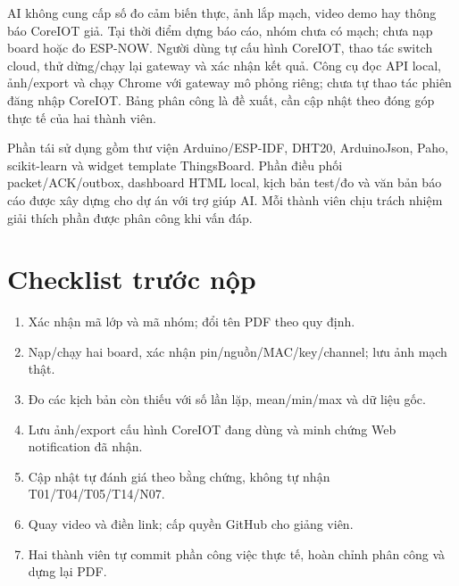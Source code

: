 AI không cung cấp số đo cảm biến thực, ảnh lắp mạch, video demo hay thông báo CoreIOT giả. Tại thời điểm dựng báo cáo, nhóm chưa có mạch; chưa nạp board hoặc đo ESP-NOW. Người dùng tự cấu hình CoreIOT, thao tác switch cloud, thử dừng/chạy lại gateway và xác nhận kết quả. Công cụ đọc API local, ảnh/export và chạy Chrome với gateway mô phỏng riêng; chưa tự thao tác phiên đăng nhập CoreIOT. Bảng phân công là đề xuất, cần cập nhật theo đóng góp thực tế của hai thành viên.

Phần tái sử dụng gồm thư viện Arduino/ESP-IDF, DHT20, ArduinoJson, Paho, scikit-learn và widget template ThingsBoard. Phần điều phối packet/ACK/outbox, dashboard HTML local, kịch bản test/đo và văn bản báo cáo được xây dựng cho dự án với trợ giúp AI. Mỗi thành viên chịu trách nhiệm giải thích phần được phân công khi vấn đáp.
\section{Checklist trước nộp}
\begin{enumerate}
\item Xác nhận mã lớp và mã nhóm; đổi tên PDF theo quy định.
\item Nạp/chạy hai board, xác nhận pin/nguồn/MAC/key/channel; lưu ảnh mạch thật.
\item Đo các kịch bản còn thiếu với số lần lặp, mean/min/max và dữ liệu gốc.
\item Lưu ảnh/export cấu hình CoreIOT đang dùng và minh chứng Web notification đã nhận.
\item Cập nhật tự đánh giá theo bằng chứng, không tự nhận T01/T04/T05/T14/N07.
\item Quay video và điền link; cấp quyền GitHub cho giảng viên.
\item Hai thành viên tự commit phần công việc thực tế, hoàn chỉnh phân công và dựng lại PDF.
\end{enumerate}
